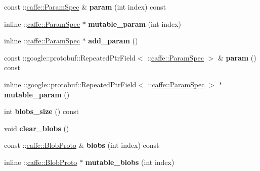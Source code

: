 \begin{DoxyCompactItemize}
const \+::\mbox{\hyperlink{classcaffe_1_1_param_spec}{caffe\+::\+Param\+Spec}} \& {\bfseries param} (int index) const
\item 
\mbox{\label{classcaffe_1_1_layer_parameter_ad673e6a2aba628632317620674796ba8}} 
inline \+::\mbox{\hyperlink{classcaffe_1_1_param_spec}{caffe\+::\+Param\+Spec}} $\ast$ {\bfseries mutable\+\_\+param} (int index)
\item 
\mbox{\label{classcaffe_1_1_layer_parameter_a25d6bf5c1876beb43ad572d2132bd4f6}} 
inline \+::\mbox{\hyperlink{classcaffe_1_1_param_spec}{caffe\+::\+Param\+Spec}} $\ast$ {\bfseries add\+\_\+param} ()
\item 
\mbox{\label{classcaffe_1_1_layer_parameter_a71180a10578ff6e02e3e7cb28d84bffe}} 
const \+::google\+::protobuf\+::\+Repeated\+Ptr\+Field$<$ \+::\mbox{\hyperlink{classcaffe_1_1_param_spec}{caffe\+::\+Param\+Spec}} $>$ \& {\bfseries param} () const
\item 
\mbox{\label{classcaffe_1_1_layer_parameter_a3b2566152a046b2bd81420a08191e1f0}} 
inline \+::google\+::protobuf\+::\+Repeated\+Ptr\+Field$<$ \+::\mbox{\hyperlink{classcaffe_1_1_param_spec}{caffe\+::\+Param\+Spec}} $>$ $\ast$ {\bfseries mutable\+\_\+param} ()
\item 
\mbox{\label{classcaffe_1_1_layer_parameter_af6e1be0ac93c361c398e01ff30d880c6}} 
int {\bfseries blobs\+\_\+size} () const
\item 
\mbox{\label{classcaffe_1_1_layer_parameter_afa1299241ea3754f3d3675dfc7b7b3cd}} 
void {\bfseries clear\+\_\+blobs} ()
\item 
\mbox{\label{classcaffe_1_1_layer_parameter_ac982d4bf5e68ed793fec3eeff8dc1d37}} 
const \+::\mbox{\hyperlink{classcaffe_1_1_blob_proto}{caffe\+::\+Blob\+Proto}} \& {\bfseries blobs} (int index) const
\item 
\mbox{\label{classcaffe_1_1_layer_parameter_af454b18f6121852715f3b2f69df3a4a9}} 
inline \+::\mbox{\hyperlink{classcaffe_1_1_blob_proto}{caffe\+::\+Blob\+Proto}} $\ast$ {\bfseries mutable\+\_\+blobs} (int index)

\end{DoxyCompactItemize}
